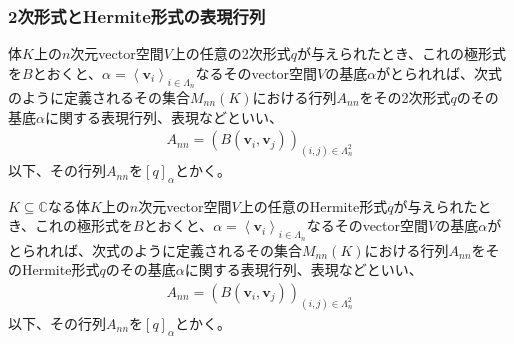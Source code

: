 \documentclass[dvipdfmx]{jsarticle}
\begin{document}
\subsubsection{2次形式とHermite形式の表現行列}%
\begin{dfn}
体$K$上の$n$次元vector空間$V$上の任意の2次形式$q$が与えられたとき、これの極形式を$B$とおくと、$\alpha = \left\langle \mathbf{v}_{i} \right\rangle_{i \in \varLambda_{n}}$なるそのvector空間$V$の基底$\alpha$がとられれば、次式のように定義されるその集合$M_{nn}(K)$における行列$A_{nn}$をその2次形式$q$のその基底$\alpha$に関する表現行列、表現などといい、
\begin{align*}
A_{nn} = \left( B\left( \mathbf{v}_{i},\mathbf{v}_{j} \right) \right)_{(i,j) \in \varLambda_{n}^{2}}
\end{align*}
以下、その行列$A_{nn}$を$[ q]_{\alpha}$とかく。
\end{dfn}
\begin{dfn}
$K \subseteq \mathbb{C}$なる体$K$上の$n$次元vector空間$V$上の任意のHermite形式$q$が与えられたとき、これの極形式を$B$とおくと、$\alpha = \left\langle \mathbf{v}_{i} \right\rangle_{i \in \varLambda_{n}}$なるそのvector空間$V$の基底$\alpha$がとられれば、次式のように定義されるその集合$M_{nn}(K)$における行列$A_{nn}$をそのHermite形式$q$のその基底$\alpha$に関する表現行列、表現などといい、
\begin{align*}
A_{nn} = \left( B\left( \mathbf{v}_{i},\mathbf{v}_{j} \right) \right)_{(i,j) \in \varLambda_{n}^{2}}
\end{align*}
以下、その行列$A_{nn}$を$[ q]_{\alpha}$とかく。
\end{dfn}
\end{document}
